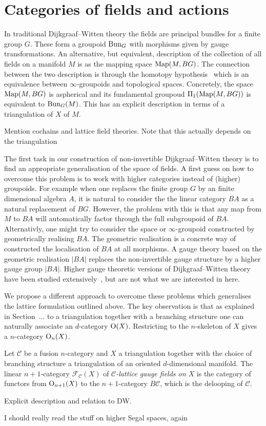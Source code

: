 
\section{Categories of fields and actions} 

In traditional Dijkgraaf--Witten theory the fields are principal bundles for a finite
group $G$. These form a groupoid $\operatorname{Bun}_G$ with morphisms given by gauge 
transformations. An alternative, but equivalent, description of the collection of all fields on a manifold $M$ is as the mapping space $\operatorname{Map}(M,BG)$. The connection
between the two description is through the homotopy hypothesis~\cite{} which is
an equivalence between $\infty$-groupoids and topological spaces. Concretely,
the space $\operatorname{Map}(M,BG)$ is aspherical and its fundamental groupoud $\Pi_1 
(\operatorname{Map}(M,BG))$ is equivalent to $\operatorname{Bun}_G(M)$.
This has an explicit description in terms of a triangulation of $X$ of $M$. 

\color{red} Mention cochains and lattice field theories. Note that this actually 
depends on the triangulation \color{black}

The first task in our construction of non-invertible Dijkgraaf--Witten theory
is to find an appropriate generalisation of the space of fields. A first guess
on how to overcome this problem is to work with higher categories instead of
(higher) groupoids. For example when one replaces the finite group $G$ by an 
finite dimensional algebra $A$, it is natural to consider the the linear category
$BA$ as a natural replacement of $BG$. However, the problem with this is 
that any map from $M$ to $BA$ will automatically factor through the full 
subgroupoid of $BA$. Alternativly, one might try to consider the space or 
$\infty$-groupoid constructed by geometrically realising $BA$. The geometric 
realisation is a concrete way of constructed the localisation of $BA$ at all 
morphisms. A gauge theory based on the geometric realisation $|BA|$ replaces the 
non-invertible gauge structure by a higher gauge group $|BA|$. Higher gauge 
theoretic versions of Dijkgraaf--Witten theory have been studied 
extensively~\cite{some thing}, but are not what we are interested in here. 

We propose a different approach to overcome these problems which generalises the
lattice formulation outlined above. The key observation is that as explained in 
Section~... to a triangulation together with a branching structure one can naturally associate an $d$-category $\operatorname{O}(X)$. Restricting to the $n$-skeleton  
of $X$ gives a $n$-category $\operatorname{O}_n(X)$. 
\begin{definition}
Let $\mathcal{C}$ be a fusion $n$-category and $X$ a triangulation together with 
the choice of branching structure a triangulation of an oriented $d$-dimensional manifold.
The linear $n+1$-category $\mathcal{F}_\mathcal{C}(X)$ of 
\emph{$\mathcal{C}$-lattice gauge fields on $X$} is the category of functors from $\operatorname{O}_{n+1}(X)$ to the $n+1$-category $B\mathcal{C}$, which is the delooping of $\mathcal{C}$. 
\end{definition}

\color{red} 
Explicit description and relation to DW.

I should really read the stuff on higher Segal spaces, again \color{black}